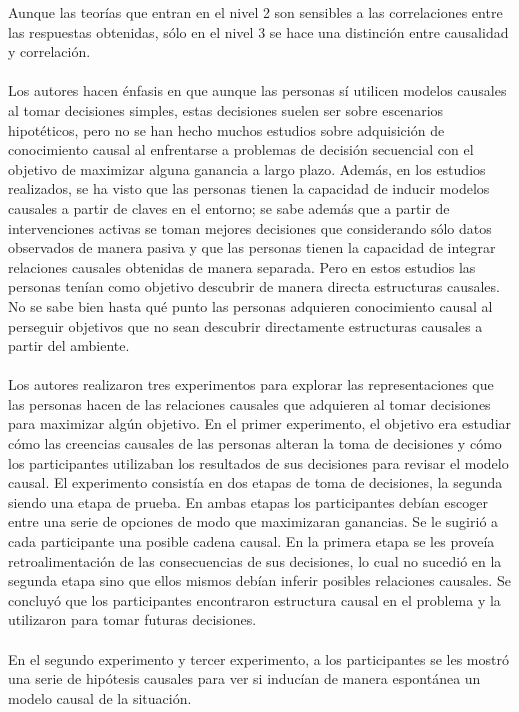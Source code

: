 \documentclass[11pt]{article}
\theoremstyle{plain}
\begin{document}
Aunque las teorías que entran en el nivel 2 son sensibles a las correlaciones entre las respuestas obtenidas, sólo en el nivel 3 se hace una distinción entre causalidad y correlación.\\
\\
Los autores hacen énfasis en que aunque las personas sí utilicen modelos causales al tomar decisiones simples, estas decisiones suelen ser sobre escenarios hipotéticos, pero no se han hecho muchos estudios sobre adquisición de conocimiento causal al enfrentarse a problemas de decisión secuencial con el objetivo de maximizar alguna ganancia a largo plazo. Además, en los estudios realizados, se ha visto que las personas tienen la capacidad de inducir modelos causales a partir de claves en el entorno; se sabe además que a partir de intervenciones activas se toman mejores decisiones que considerando sólo datos observados de manera pasiva y que las personas tienen la capacidad de integrar relaciones causales obtenidas de manera separada. Pero en estos estudios las personas tenían como objetivo descubrir de manera directa estructuras causales. No se sabe bien hasta qué punto las personas adquieren conocimiento causal al perseguir objetivos que no sean descubrir directamente estructuras causales a partir del ambiente.\\
\\
Los autores realizaron tres experimentos para explorar las representaciones que las personas hacen de las relaciones causales que adquieren al tomar decisiones para maximizar algún objetivo. En el primer experimento, el objetivo era estudiar cómo las creencias causales de las personas alteran la toma de decisiones y cómo los participantes utilizaban los resultados de sus decisiones para revisar el modelo causal. El experimento consistía en dos etapas de toma de decisiones, la segunda siendo una etapa de prueba. En ambas etapas los participantes debían escoger entre una serie de opciones de modo que maximizaran ganancias. Se le sugirió a cada participante una posible cadena causal. En la primera etapa se les proveía retroalimentación de las consecuencias de sus decisiones, lo cual no sucedió en la segunda etapa sino que ellos mismos debían inferir posibles relaciones causales. Se concluyó que los participantes encontraron estructura causal en el problema y la utilizaron para tomar futuras decisiones.\\
\\
En el segundo experimento y tercer experimento, a los participantes se les mostró una serie de hipótesis causales para ver si inducían de manera espontánea un modelo causal de la situación.\\
\end{document}
